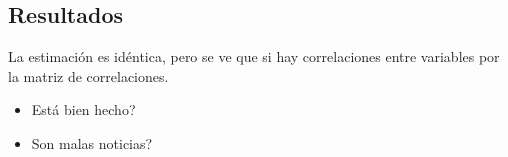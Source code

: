 \documentclass[
]{article}
\providecommand{\tightlist}{%
  \setlength{\itemsep}{0pt}\setlength{\parskip}{0pt}}
\begin{document}
\hypertarget{resultados}{%
\subsection{Resultados}\label{resultados}}

La estimación es idéntica, pero se ve que si hay correlaciones entre
variables por la matriz de correlaciones.

\begin{itemize}
\tightlist
\item
  Está bien hecho?
\item
  Son malas noticias?
\end{itemize}
\end{document}
